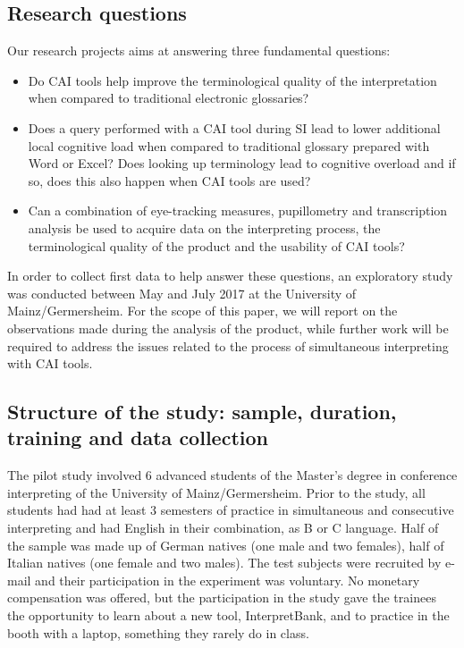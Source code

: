 \documentclass[output=paper]{langsci/langscibook}
\begin{document}
\subsection{Research questions}\label{sec:prandi:3.2}
Our research projects aims at answering three fundamental questions:

\begin{itemize}
\item Do \textsc{CAI} tools help improve the terminological quality of the interpretation when compared to traditional electronic glossaries?
\item Does a query performed with a \textsc{CAI} tool during \textsc{SI} lead to lower additional local cognitive load when compared to traditional glossary prepared with Word or Excel? Does looking up terminology lead to cognitive overload and if so, does this also happen when \textsc{CAI} tools are used?
\item Can a combination of eye-tracking measures, pupillometry and transcription analysis be used to acquire data on the interpreting process, the terminological quality of the product and the usability of \textsc{CAI} tools?
\end{itemize}

In order to collect first data to help answer these questions, an exploratory study was conducted between May and July 2017 at the University of Mainz/Germersheim. For the scope of this paper, we will report on the observations made during the analysis of the product, while further work will be required to address the issues related to the process of simultaneous interpreting with \textsc{CAI} tools.

\subsection{Structure of the study: sample, duration, training and data collection}\label{sec:prandi:3.3}
The pilot study involved 6 advanced students of the Master’s degree in conference interpreting of the University of Mainz/Germersheim. Prior to the study, all students had had at least 3 semesters of practice in simultaneous and consecutive interpreting and had English in their combination, as B or C language. Half of the sample was made up of German natives (one male and two females), half of Italian natives (one female and two males). The test subjects were recruited by e-mail and their participation in the experiment was voluntary. No monetary compensation was offered, but the participation in the study gave the trainees the opportunity to learn about a new tool, InterpretBank, and to practice in the booth with a laptop, something they rarely do in class.
\end{document}
